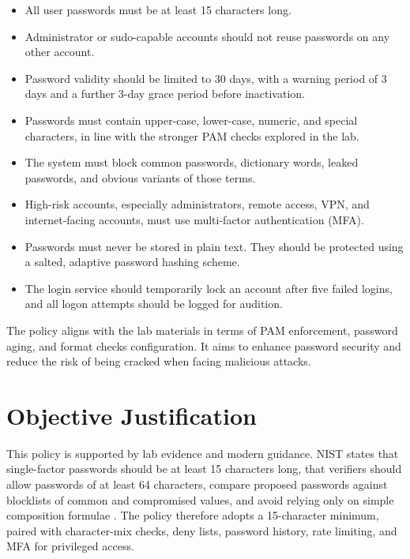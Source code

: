 \documentclass[12pt,a4paper]{article}
\begin{document}
\begin{itemize}
	\item All user passwords must be at least 15 characters long. 
	\item Administrator or sudo-capable accounts should not reuse passwords on any other account.
	\item Password validity should be limited to 30 days, with a warning period of 3 days and a
	further 3-day grace period before inactivation.
	\item Passwords must contain upper-case, lower-case, numeric, and special characters, in line
	with the stronger PAM checks explored in the lab.
	\item The system must block common passwords, dictionary words, leaked passwords, and obvious variants of those terms.
	\item High-risk accounts, especially administrators, remote access, VPN, and internet-facing
	accounts, must use multi-factor authentication (MFA).
	\item Passwords must never be stored in plain text. They should be protected using a salted,
	adaptive password hashing scheme.
	\item The login service should temporarily lock an account after five failed
	logins, and all logon attempts should be logged for audition.
\end{itemize}

The policy aligns with the lab materials in terms of PAM enforcement, password aging, and
format checks configuration. It aims to enhance password security and reduce the risk of being cracked when facing malicious attacks.
\section{Objective Justification}
This policy is supported by lab evidence and modern guidance. NIST states that single-factor passwords should be at least 15 characters
long, that verifiers should allow passwords of at least 64 characters, compare proposed
passwords against blocklists of common and compromised values, and avoid relying only on
simple composition formulae \citep{nist80063b2025}. The policy therefore adopts a 15-character
minimum, paired with character-mix checks, deny lists, password history, rate limiting, and
MFA for privileged access.
\end{document}
